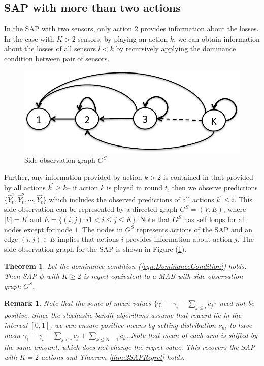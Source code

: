 \documentclass{article}
\newtheorem{thm}{Theorem}
\newtheorem{remark}{Remark}
\begin{document}
\subsection{SAP with more than two actions}
In the SAP with two sensors, only action 2 provides information about the losses. In the case with $K>2$ sensors, by playing an action $k$, we can obtain information about the losses of all sensors $l<k$ by recursively applying the dominance condition between pair of sensors. 
\begin{figure}
	\centering
	\includegraphics[scale=.5]{SideInfoGraph.pdf}
	\caption{Side observation graph $G^S$}
	\label{fig:SideObservationGraph]}
\end{figure} 
Further, any information provided by action $k>2$ is contained in that provided by all actions $k^\prime\geq k$-- if action $k$ is played in round $t$, then we observe predictions $\{\hat{Y}_t^1, \hat{Y}_t^2, \cdots, \hat{Y}_t^i\}$ which includes the observed predictions of all actions $k^\prime\leq i$. 
This side-observation can be represented by a directed graph $G^S=(V,E)$, where $|V|=K$ and $E=\{(i,j): i 1<i\leq j\leq K \}$. Note that $G^S$ has self loops for all nodes except for node $1$. The nodes in $G^S$ represents actions of the SAP and an edge $(i,j)\in E$ implies that actions $i$ provides information about action $j$. The side-observation graph for the SAP is shown in Figure (\ref{fig:SideObservationGraph]}).


\begin{thm}
	\label{thm:K-SAPRegret}
Let the dominance condition (\ref{eqn:DominanceCondition}) holds. Then SAP $\psi$ with $K\geq 2$ is regret equivalent to a MAB with side-observation graph $G^S$. 
\end{thm}

\begin{remark}
Note that the some of mean 	values $\{\gamma_1- \gamma_i - \sum_{j\leq i} c_j\}$ need not be positive. Since the stochastic bandit algorithms assume that reward lie in the interval $[0,1]$,  we can ensure positive means by setting distribution $\nu_k$, to have mean $\gamma_1- \gamma_i - \sum_{j< i} c_j + \sum_{k \leq K-1 }c_k$. Note that mean of each arm is shifted by the same amount, which does not change the regret value. This recovers the SAP with $K=2$ actions and Theorem \ref{thm:2SAPRegret} holds.
\end{remark}
\end{document}
